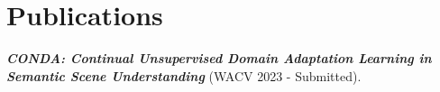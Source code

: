 \documentclass{uark}
\begin{document}















\chapter{Publications}


\textbf{\textit{CONDA: Continual Unsupervised Domain Adaptation Learning in  Semantic Scene Understanding}} (WACV 2023 - Submitted).





\appendix


\end{document}
